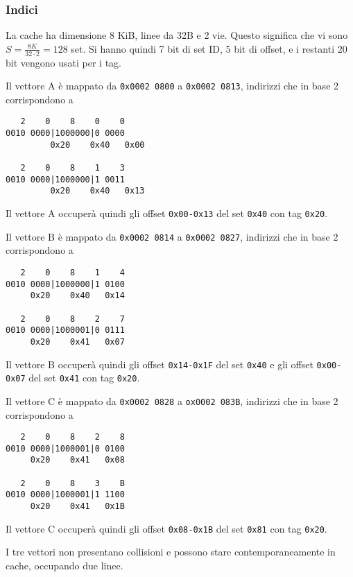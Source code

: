 \documentclass[a4paper]{article}
\begin{document}
\subsubsection{Indici}
La cache ha dimensione 8 KiB, linee da 32B e 2 vie.
Questo significa che vi sono $S = \frac{8K}{32 \cdot 2} = 128$ set.
Si hanno quindi 7 bit di set ID, 5 bit di offset, e i restanti 20 bit vengono usati per i tag.

Il vettore A è mappato da \texttt{0x0002 0800} a \texttt{0x0002 0813}, indirizzi che in base 2 corrispondono a 

\begin{verbatim}
   2    0    8    0    0
0010 0000|1000000|0 0000
		 0x20    0x40   0x00

   2    0    8    1    3
0010 0000|1000000|1 0011
		 0x20    0x40   0x13

\end{verbatim}

Il vettore A occuperà quindi gli offset \texttt{0x00-0x13} del set \texttt{0x40} con tag \texttt{0x20}.

Il vettore B è mappato da \texttt{0x0002 0814} a \texttt{0x0002 0827}, indirizzi che in base 2 corrispondono a

\begin{verbatim}
   2    0    8    1    4
0010 0000|1000000|1 0100
     0x20    0x40   0x14

   2    0    8    2    7
0010 0000|1000001|0 0111
     0x20    0x41   0x07

\end{verbatim}

Il vettore B occuperà quindi gli offset \texttt{0x14-0x1F} del set \texttt{0x40} e gli offset \texttt{0x00-0x07} del set \texttt{0x41} con tag \texttt{0x20}.

Il vettore C è mappato da \texttt{0x0002 0828} a \texttt{ox0002 083B}, indirizzi che in  base 2 corrispondono a

\begin{verbatim}
   2    0    8    2    8
0010 0000|1000001|0 0100
     0x20    0x41   0x08

   2    0    8    3    B
0010 0000|1000001|1 1100
     0x20    0x41   0x1B
\end{verbatim}

Il vettore C occuperà quindi gli offset \texttt{0x08-0x1B} del set \texttt{0x81} con tag \texttt{0x20}.

I tre vettori non presentano collisioni e possono stare contemporaneamente in cache, occupando due linee.
\end{document}
